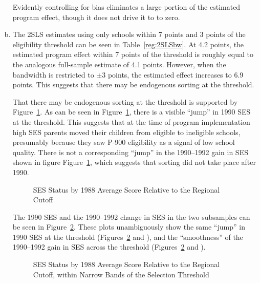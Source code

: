 \documentclass{article}
\begin{document}
\begin{enumerate}[(a)]
Evidently controlling for bias eliminates a large portion of the estimated program effect, though it does not drive it to to zero.



\item The 2SLS estimates using only schools within 7 points and 3 points of the eligibility threshold can be seen in Table~\ref{reg:2SLSbw}. At 4.2 points, the estimated program effect within 7 points of the threshold is roughly equal to the analogous full-sample estimate of 4.1 points. However, when the bandwidth is restricted to $\pm 3$ points, the estimated effect increases to 6.9 points. This suggests that there may be endogenous sorting at the threshold.



That there may be endogenous sorting at the threshold is supported by Figure~\ref{fig:SES}. As can be seen in Figure~\ref{fig:SES}, there is a visible ``jump'' in 1990 SES at the threshold. This suggests that at the time of program implementation high SES parents moved their children from eligible to ineligible schools, presumably because they saw P-900 eligibility as a signal of low school quality. There is not a corresponding ``jump'' in the 1990--1992 gain in SES shown in figure  Figure~\ref{fig:SES}, which suggests that sorting did not take place after 1990.

\begin{figure}[htb!]
\centering
{}
\caption{SES Status by 1988 Average Score Relative to the Regional Cutoff}
\label{fig:SES}
\end{figure}

The 1990 SES and the 1990--1992 change in SES in the two subsamples can be seen in Figure~\ref{fig:SESbw}. These plots unambiguously show the same ``jump'' in 1990 SES at the threshold (Figures~\ref{fig:SESbw} and ), and the ``smoothness'' of the 1990--1992 gain in SES across the threshold (Figures~\ref{fig:SESbw} and ).

\begin{figure}[htb!]
\centering
{}
\caption{SES Status by 1988 Average Score Relative to the Regional Cutoff, within Narrow Bands of the Selection Threshold}
\label{fig:SESbw}
\end{figure}


\end{enumerate}
\end{document}
